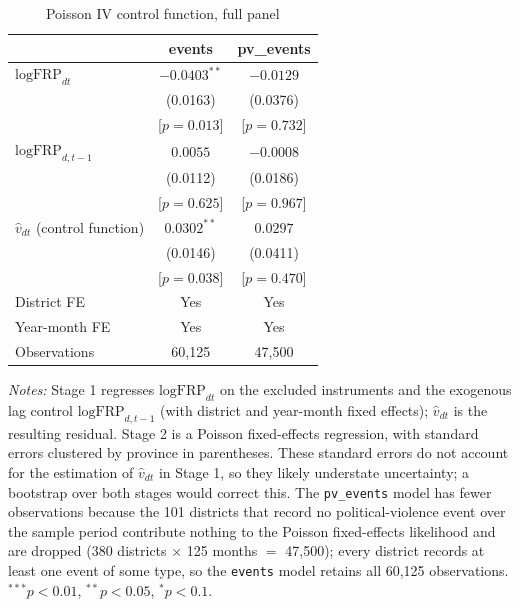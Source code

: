 \documentclass[12pt]{article}
\begin{document}
\begin{table}[H]
\centering
\caption{Poisson IV control function, full panel}
\label{tab:poisson}
\begin{tabular}{lcc}
\toprule
 & events & pv\_events \\
\midrule
$\text{logFRP}_{dt}$       & $-0.0403^{**}$ & $-0.0129$ \\
                            & (0.0163) & (0.0376) \\
                            & [$p=0.013$] & [$p=0.732$] \\
$\text{logFRP}_{d,t-1}$    & $0.0055$ & $-0.0008$ \\
                            & (0.0112) & (0.0186) \\
                            & [$p=0.625$] & [$p=0.967$] \\
$\hat{v}_{dt}$ (control function) & $0.0302^{**}$ & $0.0297$ \\
                            & (0.0146) & (0.0411) \\
                            & [$p=0.038$] & [$p=0.470$] \\
\midrule
District FE     & Yes & Yes \\
Year-month FE   & Yes & Yes \\
Observations     & 60{,}125 & 47{,}500 \\
\bottomrule
\end{tabular}
\begin{minipage}{0.85\textwidth}
\vspace{4pt}
\footnotesize \emph{Notes:} Stage 1 regresses $\text{logFRP}_{dt}$ on the excluded instruments and the exogenous lag control $\text{logFRP}_{d,t-1}$ (with district and year-month fixed effects); $\hat{v}_{dt}$ is the resulting residual. Stage 2 is a Poisson fixed-effects regression, with standard errors clustered by province in parentheses. These standard errors do not account for the estimation of $\hat{v}_{dt}$ in Stage 1, so they likely understate uncertainty; a bootstrap over both stages would correct this. The \texttt{pv\_events} model has fewer observations because the 101 districts that record no political-violence event over the sample period contribute nothing to the Poisson fixed-effects likelihood and are dropped (380 districts $\times$ 125 months $=$ 47{,}500); every district records at least one event of some type, so the \texttt{events} model retains all 60{,}125 observations. $^{***}p<0.01$, $^{**}p<0.05$, $^{*}p<0.1$.
\end{minipage}
\end{table}
\end{document}
